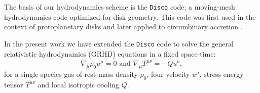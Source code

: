 \documentclass{emulateapj}
\newcommand{\Disco}{{\texttt{Disco}}}
\begin{document}
The basis of our hydrodynamics scheme is the \Disco{} code; a moving-mesh hydrodynamics
code optimized for disk geometry. This code was first used in the context of
protoplanetary disks \citep{Duffell12, Duffell13, Duffell14} and later applied 
to circumbinary accretion \citep{Farris14, Farris15A, Farris15B}. 

In the present work we have extended the \Disco{} code to solve the general relativistic hydrodynamics (GRHD) equations in a fixed space-time:
\begin{equation}
    \nabla_\mu \rho_0 u^\mu = 0 \text{ and } \nabla_\mu T^{\mu\nu} = -\dot{Q} u^\nu , \label{eq:GRHD}
\end{equation}
for a single species gas of rest-mass density $\rho_0$, four velocity $u^\mu$, 
stress energy tensor $T^{\mu\nu}$ and local isotropic cooling $\dot{Q}$.  
\end{document}
